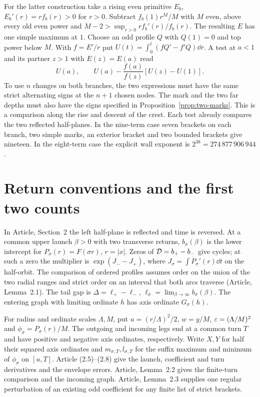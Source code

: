 For the latter construction take a rising even primitive $E_b$,
$E_b'(r)=rf_b(r)>0$ for $r>0$. Subtract $f_b(1)r^M/M$ with $M$ even,
above every old even power and $M-2>\sup_{r>0}rf_b'(r)/f_b(r)$.
The resulting $E$ has one simple maximum at $1$. Choose an odd profile
$Q$ with $Q(1)=0$ and top power below $M$. With $f=E'/r$ put
$U(t)=\int_0^t(fQ'-f'Q)\dd r$. A test at $a<1$ and its partner
$z>1$ with $E(z)=E(a)$ read
\[
 U(a),\qquad U(a)-\frac{f(a)}{f(z)}[U(z)-U(1)] .
\]
To use $n$ changes on both branches, the two expressions must have the
same strict alternating signs at the $n+1$ chosen nodes. The mark
and the two far depths must also have the signs specified in
Proposition~\ref{prop:two-marks}. This is a comparison along the
rise and descent of the crest. Each test already compares the two
reflected half-planes. In the nine-term case seven brackets on each
branch, two simple marks, an exterior bracket and two bounded brackets
give nineteen. In the eight-term case the explicit wall exponent is
$2^{38}=274\,877\,906\,944$.

\section{Return conventions and the first two counts}\label{sec:toolkit}
In Article, Section~2 the left half-plane is reflected and time is reversed.
At a common upper launch $\beta>0$ with two transverse returns,
$b_\sigma(\beta)$ is the lower intercept for $P_\sigma(r)=F(\sigma r)$,
$r=|x|$. Zeros of $\mathcal{D}=b_+-b_-$ give cycles; at such a zero the
multiplier is $\exp(J_--J_+)$, where $J_\sigma=\int P_\sigma'(r)\dd t$
on the half-orbit. The comparison of ordered profiles assumes order on
the union of the two radial ranges and strict order on an interval that
both arcs traverse (Article, Lemma~2.1). The tail gap is
$\Delta=\ell_+-\ell_-$, $\ell_\sigma=\lim_{\beta\to\infty}b_\sigma(\beta)$.
The entering graph with limiting ordinate $h$ has axis ordinate $G_\sigma(h)$.

For radius and ordinate scales $\Lambda,M$, put $u=(r/\Lambda)^2/2$,
$w=y/M$, $\varepsilon=(\Lambda/M)^2$ and $\phi_\sigma=P_\sigma(r)/M$.
The outgoing and incoming legs end at a common turn $T$ and have
positive and negative axis ordinates, respectively. Write $X,Y$ for
half their squared axis ordinates and $m_{\sigma,T},l_{\sigma,T}$ for
the suffix maximum and minimum of $\phi_\sigma$ on $[u,T]$.
Article (2.5)--(2.8) give the launch, coefficient and turn derivatives
and the envelope errors. Article, Lemma~2.2 gives the finite-turn
comparison and the incoming graph. Article, Lemma~2.3 supplies one
regular perturbation of an existing odd coefficient for any finite
list of strict brackets.



